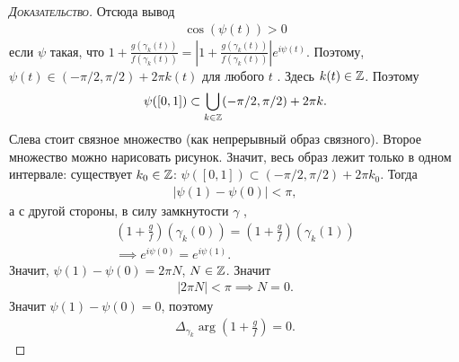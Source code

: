 \documentclass[../complex-analysis.tex]{subfiles}
\begin{document}
\begin{proof}[\normalfont\textsc{Доказательство}]
Отсюда вывод
 \begin{align*}
  \cos(\psi(t)) > 0
 \end{align*} если $ \psi $ такая, что  $ 1 + \frac{g(\gamma_k(t))}{f(\gamma_k(t))} = \left| 1 + \frac{g(\gamma_k(t))}{f(\gamma_k(t))} \right|e^{i\psi(t)} $. Поэтому, $ \psi(t) \in (- \pi / 2, \pi / 2) + 2\pi k (t) $ для любого  $ t $ . Здесь $ k(t) \in \mathbb{Z} $. Поэтому
  \begin{align*}
  \psi([0,1]) \subset \bigcup_{k \in \mathbb{Z}} (-\pi / 2, \pi / 2) + 2\pi k.
 \end{align*} Слева стоит связное множество (как непрерывный образ связного). Второе множество можно нарисовать {\color{red} рисунок}. Значит, весь образ лежит только в одном интервале: существует $ k_0 \in \mathbb{Z} $: $ \psi([0,1]) \subset (-\pi / 2, \pi / 2) + 2\pi k_0 $. Тогда
 \begin{align*}
  \left|\psi(1) - \psi(0) \right| < \pi,
 \end{align*} а с другой стороны, в силу замкнутости $\gamma$ ,
 \begin{align*}
  \left( 1+ \frac{g}{f} \right)(\gamma_k(0)) = \left(1 + \frac{g} f\right)(\gamma_k(1)) \\
  \implies e^{i\psi(0)} = e^{i\psi(1)}.
 \end{align*} Значит, $ \psi(1) - \psi(0) = 2\pi N $, $ N \in \mathbb{Z} $. Значит
 \begin{align*}
  \left|2\pi N \right| < \pi \implies N = 0.
 \end{align*} Значит $ \psi(1) -\psi(0)=0 $, поэтому
 \begin{align*}
  \Delta_{\gamma_k} \arg \left( 1 + \frac{g}{f} \right) = 0.
 \end{align*}

\end{proof}
\end{document}
